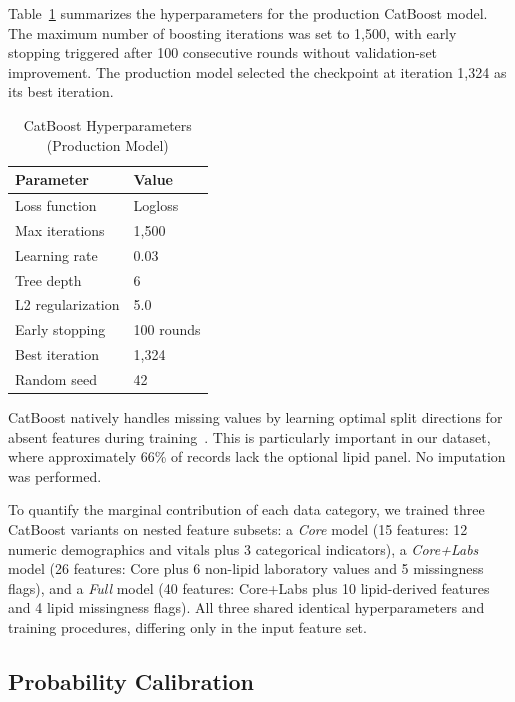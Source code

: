 Table~\ref{tab:catboost-hyperparams} summarizes the hyperparameters for the production CatBoost model. The maximum number of boosting iterations was set to 1,500, with early stopping triggered after 100 consecutive rounds without validation-set improvement. The production model selected the checkpoint at iteration 1,324 as its best iteration.

\begin{table}[ht]
\centering
\caption{CatBoost Hyperparameters (Production Model)}
\label{tab:catboost-hyperparams}
\begin{tabular}{ll}
\hline
\textbf{Parameter} & \textbf{Value} \\
\hline
Loss function        & Logloss \\
Max iterations       & 1,500 \\
Learning rate        & 0.03 \\
Tree depth           & 6 \\
L2 regularization    & 5.0 \\
Early stopping       & 100 rounds \\
Best iteration       & 1,324 \\
Random seed          & 42 \\
\hline
\end{tabular}
\end{table}

CatBoost natively handles missing values by learning optimal split directions for absent features during training~\cite{Nijman2022missingdata}. This is particularly important in our dataset, where approximately 66\% of records lack the optional lipid panel. No imputation was performed.

To quantify the marginal contribution of each data category, we trained three CatBoost variants on nested feature subsets: a \emph{Core} model (15 features: 12 numeric demographics and vitals plus 3 categorical indicators), a \emph{Core+Labs} model (26 features: Core plus 6 non-lipid laboratory values and 5 missingness flags), and a \emph{Full} model (40 features: Core+Labs plus 10 lipid-derived features and 4 lipid missingness flags). All three shared identical hyperparameters and training procedures, differing only in the input feature set.

\subsection{Probability Calibration}
\label{subsec:calibration}

